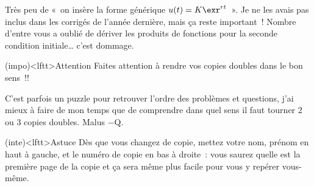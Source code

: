 \documentclass[a4paper, 10pt, final, garamond]{book}
\begin{document}
Très peu de «~on insère la forme générique $u(t) = K \exr^{rt}$~». Je ne les
avais pas inclus dans les corrigés de l'année dernière, mais ça reste
important~!
\smallbreak
Nombre d'entre vous a oublié de dériver les produits de fonctions pour la seconde
condition initiale… c'est dommage.
\begin{tcn}(impo)<lftt>{Attention}
	\large
	Faites attention à rendre vos copies doubles dans le bon sens~!!
\end{tcn}
C'est parfois un puzzle pour retrouver l'ordre des problèmes et questions, j'ai
mieux à faire de mon temps que de comprendre dans quel sens il faut tourner 2 ou
3 copies doubles. Malus $-$Q.
\begin{tcn}(inte)<lftt>{Astuce}
	Dès que vous changez de copie, mettez votre nom, prénom en haut à gauche, et
	le numéro de copie en bas à droite~: vous saurez quelle est la première page
	de la copie et ça sera même plus facile pour vous y repérer vous-même.
\end{tcn}

\setcounter{section}{0}
\end{document}

